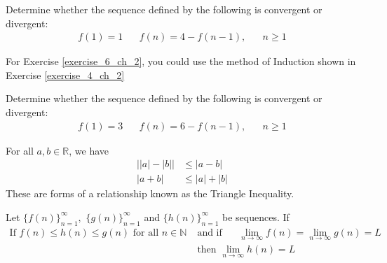 \begin{exercise}\label{exercise_6_ch_2}
Determine whether the sequence defined by the following is convergent or divergent:
\begin{align*}
    f(1) = 1 \hspace{20pt} f(n) = 4 - f(n-1), \hspace{20pt} n \geq 1
\end{align*}
\end{exercise}

For Exercise \ref{exercise_6_ch_2}, you could use the method of Induction shown in Exercise \ref{exercise_4_ch_2}

\begin{exercise}
Determine whether the sequence defined by the following is convergent or divergent:
\begin{align*}
    f(1) = 3 \hspace{20pt} f(n) = 6 - f(n-1), \hspace{20pt} n \geq 1
\end{align*}
\end{exercise}

\begin{recall}
For all $a, b \in \mathbb{R}$, we have
\begin{align*}
    \Big\lvert \lvert a \rvert - \lvert b \rvert \Big\rvert &\leq \lvert a - b \rvert \\[2ex]
    \lvert a + b \rvert &\leq \lvert a \rvert + \lvert b \rvert
\end{align*}
These are forms of a relationship known as the Triangle Inequality.
\label{triangle_inequality}
\end{recall}

\begin{theorem}
Let $\{f(n)\}_{n=1}^{\infty}, \hspace{4pt} \{g(n)\}_{n=1}^{\infty}$ and $\{h(n)\}_{n=1}^{\infty}$ be sequences. If
\begin{align*}
    \text{If} \hspace{4pt} f(n)\leq h(n)\leq g(n) \hspace{4pt} \text{for all} \hspace{4pt} n \in \mathbb{N} \hspace{20pt}
    & \text{and if}  \hspace{20pt} \lim_{n \longrightarrow \infty} f(n) = \lim_{n \longrightarrow \infty} g(n) = L \\[2ex]
    & \text{then} \hspace{4pt} \lim_{n \longrightarrow \infty} h(n) = L 
\end{align*}
\label{squeeze_theorem}
\end{theorem}

